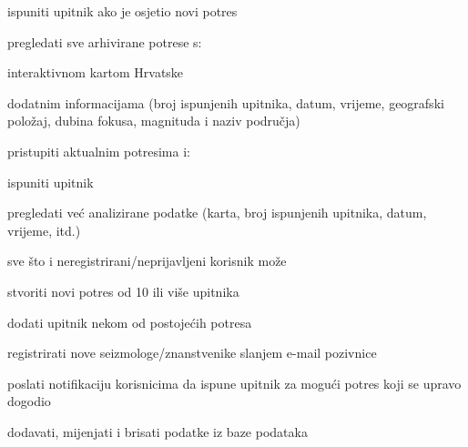 			
			\begin{packed_enum}
				\item  {}
				
				\begin{packed_enum}
					
					\item ispuniti upitnik ako je osjetio novi potres
					\item pregledati sve arhivirane potrese s:
					\begin{packed_enum}

						\item interaktivnom kartom Hrvatske 
						\item dodatnim informacijama (broj ispunjenih upitnika, datum, vrijeme, geografski položaj, dubina fokusa, magnituda i naziv područja)
					
					\end{packed_enum}
					\item pristupiti aktualnim potresima i:
					\begin{packed_enum}

						\item ispuniti upitnik
						\item pregledati već analizirane podatke (karta, broj ispunjenih upitnika, datum, vrijeme, itd.)
					
					\end{packed_enum}
				\end{packed_enum}
			
				\item  \underbar{Administrator može:}
				
				\begin{packed_enum}

					\item sve što i neregistrirani/neprijavljeni korisnik može
					\item stvoriti novi potres od 10 ili više upitnika
					\begin{packed_enum}

						\item dodati upitnik nekom od postojećih potresa
					
					\end{packed_enum}
					\item registrirati nove seizmologe/znanstvenike slanjem e-mail pozivnice
					\item poslati notifikaciju korisnicima da ispune upitnik za mogući potres koji se upravo dogodio
					\item dodavati, mijenjati i brisati podatke iz baze podataka
					

\end{packed_enum}
\end{packed_enum}
